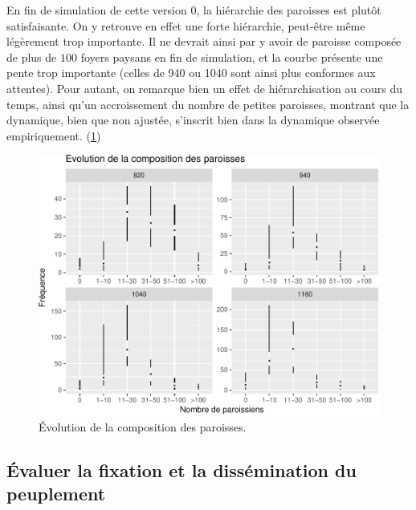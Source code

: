 
\begin{mdframed}[backgroundcolor=gray!10,footnoteinside=false]
En fin de simulation de cette version 0, la hiérarchie des paroisses est plutôt satisfaisante.
On y retrouve en effet une forte hiérarchie, peut-être même légèrement trop importante.
Il ne devrait ainsi par y avoir de paroisse composée de plus de $100$ foyers paysans en fin de simulation, et la courbe présente une pente trop importante (celles de 940 ou 1040 sont ainsi plus conformes aux attentes).
Pour autant, on remarque bien un effet de hiérarchisation au cours du temps, ainsi qu'un accroissement du nombre de petites paroisses, montrant que la dynamique, bien que non ajustée, s'inscrit bien dans la dynamique observée empiriquement.
(\cref{fig:compo-paroisses-v0})
\end{mdframed}

\begin{figure}[H]
\captionsetup{width=\linewidth}
\includegraphics[width=\linewidth]{img/resultats/v0_compo_paroisses.pdf}
\caption{Évolution de la composition des paroisses.}
\label{fig:compo-paroisses-v0}
\end{figure}

\clearpage

\subsection{Évaluer la fixation et la dissémination du peuplement}


